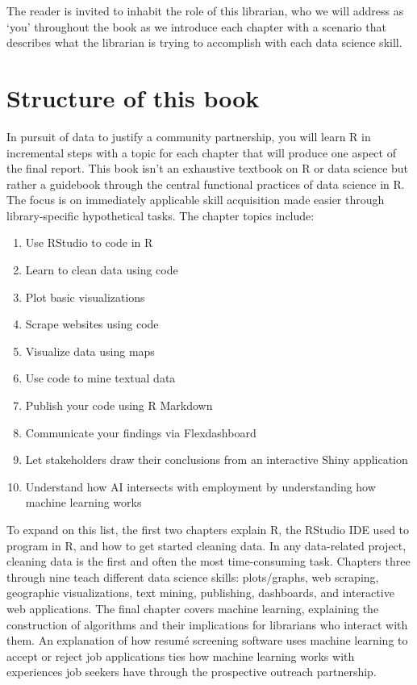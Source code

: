\documentclass[
  krantz2]{krantz}
\providecommand{\tightlist}{%
  \setlength{\itemsep}{0pt}\setlength{\parskip}{0pt}}
\begin{document}
The reader is invited to inhabit the role of this librarian, who we will address as `you' throughout the book as we introduce each chapter with a scenario that describes what the librarian is trying to accomplish with each data science skill.

\hypertarget{book-structure}{%
\section{Structure of this book}\label{book-structure}}

In pursuit of data to justify a community partnership, you will learn R in incremental steps with a topic for each chapter that will produce one aspect of the final report. This book isn't an exhaustive textbook on R or data science but rather a guidebook through the central functional practices of data science in R. The focus is on immediately applicable skill acquisition made easier through library-specific hypothetical tasks. The chapter topics include:

\begin{enumerate}
\def\labelenumi{\arabic{enumi}.}
\tightlist
\item
  Use RStudio to code in R
\item
  Learn to clean data using code
\item
  Plot basic visualizations
\item
  Scrape websites using code
\item
  Visualize data using maps
\item
  Use code to mine textual data
\item
  Publish your code using R Markdown
\item
  Communicate your findings via Flexdashboard
\item
  Let stakeholders draw their conclusions from an interactive Shiny application
\item
  Understand how AI intersects with employment by understanding how machine learning works
\end{enumerate}

To expand on this list, the first two chapters explain R, the RStudio IDE used to program in R, and how to get started cleaning data. In any data-related project, cleaning data is the first and often the most time-consuming task. Chapters three through nine teach different data science skills: plots/graphs, web scraping, geographic visualizations, text mining, publishing, dashboards, and interactive web applications. The final chapter covers machine learning, explaining the construction of algorithms and their implications for librarians who interact with them. An explanation of how resumé screening software uses machine learning to accept or reject job applications ties how machine learning works with experiences job seekers have through the prospective outreach partnership.
\end{document}
